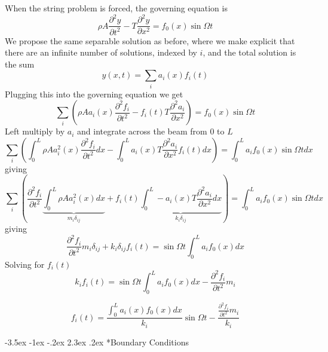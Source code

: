 \documentclass[letterpaper,twocolumn,notitlepage]{article}
\makeatletter
\renewcommand\subsection{\@startsection{section}{1}{\z@}%
 {-3.5ex \@plus-1ex \@minus-.2ex}%
 {2.3ex \@plus.2ex}%
 {\fontsize{8pt}{8pt}\selectfont\sffamily}}
\makeatother
\begin{document}
  When the string problem is forced, the governing equation is
  \begin{equation*}
    \boxed{\rho A\frac{\partial^{2}y}{\partial t^{2}}-T\frac{\partial^{2}y}{\partial x^{2}}=f_{0}(x)\sin\Omega t}
  \end{equation*}
  We propose the same separable solution as before, where we make explicit that there are an infinite number of solutions, indexed by $i$, and the total solution is the sum
  \begin{equation*}
    y(x,t)=\sum_{i}a_{i}(x)f_{i}(t)
  \end{equation*}
  Plugging this into the governing equation we get
  \begin{equation*}
    \sum_{i}\left(\rho Aa_{i}(x)\frac{\partial^{2}f_{i}}{\partial t^{2}}-f_{i}(t)T\frac{\partial^{2}a_{i}}{\partial x^{2}}\right)=f_{0}(x)\sin\Omega t
  \end{equation*}
  Left multiply by $a_{i}$ and integrate across the beam from $0$ to $L$
  \begin{equation*}
    \sum_{i}\left(\int_{0}^{L}\rho Aa_{i}^{2}(x)\frac{\partial^{2}f_{i}}{\partial t^{2}}dx-\int_{0}^{L}a_{i}(x)T\frac{\partial^{2}a_{i}}{\partial x^{2}}f_{i}(t)dx\right)=\int_{0}^{L}a_{i}f_{0}(x)\sin\Omega tdx
  \end{equation*}
  giving
  \begin{equation*}
    \sum_{i}\left(\frac{\partial^{2}f_{i}}{\partial t^{2}}\underbrace{\int_{0}^{L}\rho Aa_{i}^{2}(x)dx}_{m_{i}\delta_{ij}}+f_{i}(t)\underbrace{\int_{0}^{L}-a_{i}(x)T\frac{\partial^{2}a_{i}}{\partial x^{2}}dx}_{k_{i}\delta_{ij}}\right)=\int_{0}^{L}a_{i}f_{0}(x)\sin\Omega tdx
  \end{equation*}
  giving
  \begin{equation*}
    \frac{\partial^{2}f_{i}}{\partial t^{2}}m_{i}\delta_{ij}+k_{i}\delta_{ij}f_{i}(t)=\sin\Omega t\int_{0}^{L}a_{i}f_{0}(x)dx
  \end{equation*}
  Solving for $f_{i}(t)$
  \begin{equation*}
    k_{i}f_{i}(t)=\sin\Omega t\int_{0}^{L}a_{i}f_{0}(x)dx-\frac{\partial^{2}f_{i}}{\partial t^{2}}m_{i}
  \end{equation*}

  \begin{equation*}
  f_{i}(t)=\frac{\int_{0}^{L}a_{i}(x)f_{0}(x)dx}{k_{i}}\sin\Omega t-\frac{\frac{\partial^{2}f_{i}}{\partial t^{2}}m_{i}}{k_{i}}
  \end{equation*}

  \subsection*{Boundary Conditions}
\end{document}
